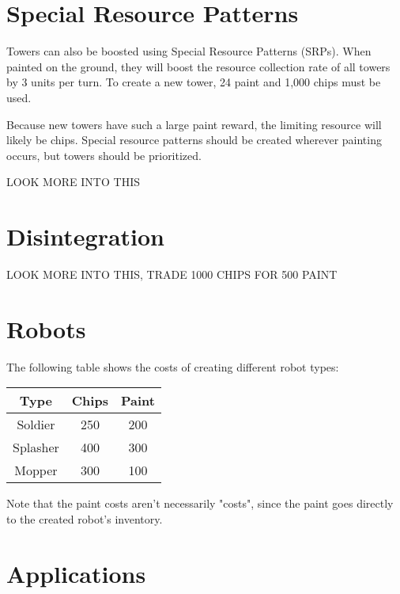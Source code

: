\documentclass{article}
\begin{document}
  \section*{Special Resource Patterns}

  Towers can also be boosted using Special Resource Patterns (SRPs). When painted on the ground, they will boost the resource collection rate of all towers by 3 units per turn. To create a new tower, 24 paint and 1,000 chips must be used. 

  \medskip

  Because new towers have such a large paint reward, the limiting resource will likely be chips. Special resource patterns should be created wherever painting occurs, but towers should be prioritized.

  \begin{center}
    LOOK MORE INTO THIS
  \end{center}

  \section*{Disintegration}

  \begin{center}
    LOOK MORE INTO THIS, TRADE 1000 CHIPS FOR 500 PAINT
  \end{center}

  \section*{Robots}

  The following table shows the costs of creating different robot types:

  \begin{center}
    \begin{tabular}{c | c | c}
      Type & Chips & Paint \\
      \hline
      Soldier & 250 & 200 \\
      Splasher & 400 & 300 \\
      Mopper & 300 & 100
    \end{tabular}
  \end{center}

  Note that the paint costs aren't necessarily "costs", since the paint goes directly to the created robot's inventory.

  \section*{Applications}
\end{document}
